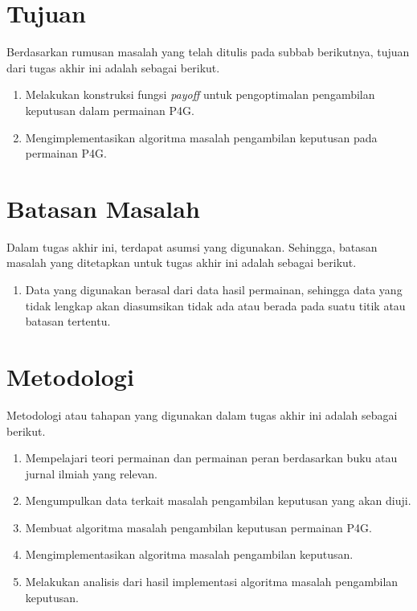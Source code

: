 \section{Tujuan}
Berdasarkan rumusan masalah yang telah ditulis pada subbab berikutnya, tujuan dari tugas akhir ini adalah sebagai berikut.
\begin{enumerate}
    \item Melakukan konstruksi fungsi \textit{payoff} untuk pengoptimalan pengambilan keputusan dalam permainan P4G.
    \item Mengimplementasikan algoritma masalah pengambilan keputusan pada permainan P4G.
\end{enumerate}

\section{Batasan Masalah}
Dalam tugas akhir ini, terdapat asumsi yang digunakan. Sehingga, batasan masalah yang ditetapkan untuk tugas akhir ini adalah sebagai berikut.
\begin{enumerate}
    \item Data yang digunakan berasal dari data hasil permainan, sehingga data yang tidak lengkap akan diasumsikan tidak ada atau berada pada suatu titik  atau batasan tertentu.
\end{enumerate}

\section{Metodologi}
Metodologi atau tahapan yang digunakan dalam tugas akhir ini adalah sebagai berikut.
\begin{enumerate}
    \item Mempelajari teori permainan dan permainan peran berdasarkan buku atau jurnal ilmiah yang relevan.
    \item Mengumpulkan data terkait masalah pengambilan keputusan yang akan diuji.
    \item Membuat algoritma masalah pengambilan keputusan permainan P4G.
    \item Mengimplementasikan algoritma masalah pengambilan keputusan.
    \item Melakukan analisis dari hasil implementasi algoritma masalah pengambilan keputusan.
\end{enumerate}
